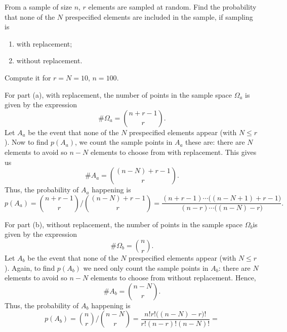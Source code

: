 \begin{problem}
  From a sample of size \(n\), \(r\) elements are sampled at random. Find
  the probability that none of the \(N\) prespecified elements are included
  in the sample, if sampling is
  \begin{enumerate}[label=(\alph*)]
  \item with replacement;
  \item without replacement.
  \end{enumerate}
  Compute it for \(r=N=10\), \(n=100\).
\end{problem}
\begin{solution}
  For part (a), with replacement, the number of points in the sample space
  \(\Omega_a\) is given by the expression
  \begin{equation}
    \label{eq:1-6}
    \#\Omega_a=\binom{n+r-1}{r}.
  \end{equation}
  Let \(A_a\) be the event that none of the \(N\) prespecified elements
  appear (with \(N\leq r\)). Now to find \(p(A_a)\), we count the sample
  points in \(A_a\) these are: there are \(N\) elements to avoid so \(n-N\)
  elements to choose from with replacement. This gives us
  \begin{equation}
    \label{eq:1-7}
    \#A_a=\binom{(n-N)+r-1}{r}.
  \end{equation}
  Thus, the probability of \(A_a\) happening is
  \[
    p(A_a)=
    \binom{n+r-1}{r}
    \biggl/
    \binom{(n-N)+r-1}{r}=
    \frac{(n+r-1)\dotsm\bigl((n-N+1)+r-1\bigr)}{(n-r)\dotsm\bigl((n-N)-r\bigr)}.
  \]

  For part (b), without replacement, the number of points in the sample
  space \(\Omega_b\)is given by the expression
  \begin{equation}
    \label{eq:1-8}
    \#\Omega_b=\binom{n}{r}.
  \end{equation}
  Let \(A_b\) be the event that none of the \(N\) prespecified elements
  appear (with \(N\leq r\)). Again, to find \(p(A_b)\) we need only count
  the sample points in \(A_b\): there are \(N\) elements to avoid so
  \(n-N\) elements to choose from without replacement. Hence,
  \begin{equation}
    \label{eq:1-9}
    \#A_b=
    \binom{n-N}{r}.
  \end{equation}
  Thus, the probability of \(A_b\) happening is
  \[
    p(A_b)=%
    \binom{n}{r}\biggl/\binom{n-N}{r}=%
    \frac{n!r!\bigl((n-N)-r\bigr)!}{r!(n-r)!(n-N)!}=%
  \]
\end{solution}
\newpage

